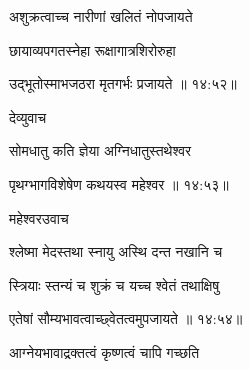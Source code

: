 {\devanagarifont अशुक्रत्वाच्च नारीणां खलितं नोपजायते \thinspace{\dandab} \dontdisplaylinenum }%
 
{\devanagarifont छायाव्यपगतस्नेहा रूक्षागात्रशिरोरुहा  \danda\dontdisplaylinenum }%


{\devanagarifont उद्भूतोस्माभजठरा मृतगर्भः प्रजायते {॥ १४:५२॥} \veg\dontdisplaylinenum }%

{\devanagarifont देव्युवाच {\dandab}\dontdisplaylinenum  }%
 
{\devanagarifont सोमधातु कति ज्ञेया अग्निधातुस्तथेश्वर \thinspace{\danda} \dontdisplaylinenum }%


{\devanagarifont पृथग्भागविशेषेण कथयस्व महेश्वर {॥ १४:५३॥} \veg\dontdisplaylinenum }%
 
{\devanagarifont महेश्वरउवाच {\dandab}\dontdisplaylinenum  }%

{\devanagarifont श्लेष्मा मेदस्तथा स्नायु अस्थि दन्त नखानि च \thinspace{\danda} \dontdisplaylinenum }%

{\devanagarifont स्त्रियाः स्तन्यं च शुक्रं च यच्च श्वेतं तथाक्षिषु  \danda\dontdisplaylinenum }%


{\devanagarifont एतेषां सौम्यभावत्वाच्छ्वेतत्वमुपजायते {॥ १४:५४॥} \veg\dontdisplaylinenum }%

{\devanagarifont आग्नेयभावाद्रक्तत्वं कृष्णत्वं चापि गच्छति \thinspace{\dandab} \dontdisplaylinenum }%


